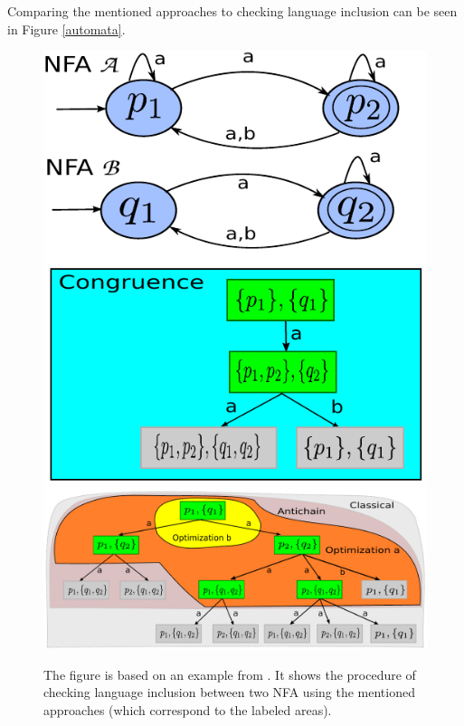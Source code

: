 Comparing the mentioned approaches to checking language inclusion can be seen in Figure \ref{automata}.
\begin{figure}[bt]
\begin{center}
	\scalebox{1}
	{
		\includegraphics[scale=0.5]{fig/congr1.pdf}
		\hspace{0.55cm}
  	\includegraphics[scale=0.5]{fig/ac1.pdf}
	}
  \caption{
      \rm{
      \hspace{0.1cm} The figure is based on an example from \cite{tacas10}.
      It shows the procedure of checking language inclusion between two NFA using the mentioned approaches (which correspond to the labeled areas).
}}
\end{center}
\end{figure}
